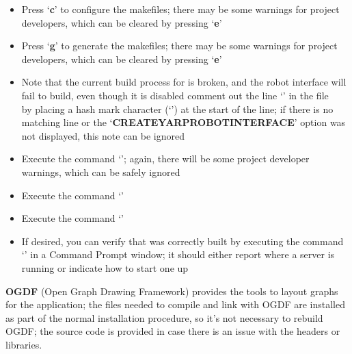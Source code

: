 \begin{itemize}
and\\
`\textbf{YARP\fUS{}USE\fUS{}READLINE}' (if present) should be disabled
\item\exSp{}Press `\textbf{c}' to configure the makefiles; there may be some
 warnings for project developers, which can be cleared by pressing
`\textbf{e}'
\item\exSp{}Press `\textbf{g}' to generate the makefiles; there may be some 
warnings for project developers, which can be cleared by pressing `\textbf{e}'
\item\exSp{}Note that the current build process for \yarp{} is broken, and the robot
interface will fail to build, even though it is disabled \longDash{} comment out the line
`' in the file\\
 by placing a hash mark character
(`\asCode{\#}') at the start of the line; if there is no matching line or the
`\textbf{CREATE\fUS{}YARPROBOTINTERFACE}' option was not displayed, this note can be
ignored
\item\exSp{}Execute the command `'; again, there will be some project
developer warnings, which can be safely ignored
\item\exSp{}Execute the command `'
\item\exSp{}Execute the command `'
\item\exSp{}If desired, you can verify that \yarp{} was correctly built by executing the
command `' in a Command Prompt window; it should either report where a
\yarp{} server is running or indicate how to start one up
\end{itemize}
\tertiaryEnd
\secondaryEnd
{}
\textbf{OGDF} (Open Graph Drawing Framework) provides the tools to layout graphs for the
\MMMU{} application; the files needed to compile and link with OGDF are installed as part
of the normal \mplusm{} installation procedure, so it's not necessary to rebuild OGDF; the
source code is provided in case there is an issue with the headers or libraries.
